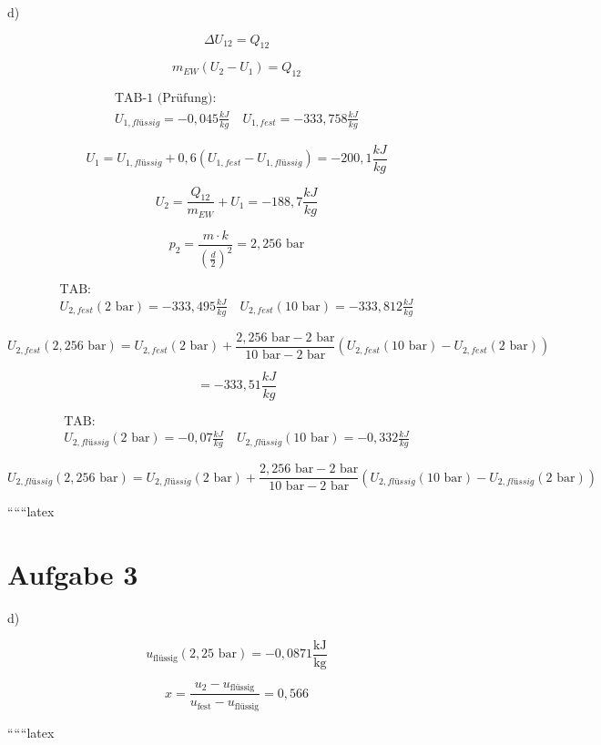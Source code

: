 d)

\[
\Delta U_{12} = Q_{12}
\]

\[
m_{EW} (U_2 - U_1) = Q_{12}
\]

\[
\begin{array}{c}
\text{TAB-1 (Prüfung):} \\
U_{1, flüssig} = -0,045 \frac{kJ}{kg} \quad U_{1, fest} = -333,758 \frac{kJ}{kg}
\end{array}
\]

\[
U_1 = U_{1, flüssig} + 0,6 \left( U_{1, fest} - U_{1, flüssig} \right) = -200,1 \frac{kJ}{kg}
\]

\[
U_2 = \frac{Q_{12}}{m_{EW}} + U_1 = -188,7 \frac{kJ}{kg}
\]

\[
p_2 = \frac{m \cdot k}{\left( \frac{d}{2} \right)^2} = 2,256 \text{ bar}
\]

\[
\begin{array}{c}
\text{TAB:} \\
U_{2, fest} (2 \text{ bar}) = -333,495 \frac{kJ}{kg} \quad U_{2, fest} (10 \text{ bar}) = -333,812 \frac{kJ}{kg}
\end{array}
\]

\[
U_{2, fest} (2,256 \text{ bar}) = U_{2, fest} (2 \text{ bar}) + \frac{2,256 \text{ bar} - 2 \text{ bar}}{10 \text{ bar} - 2 \text{ bar}} \left( U_{2, fest} (10 \text{ bar}) - U_{2, fest} (2 \text{ bar}) \right)
\]

\[
= -333,51 \frac{kJ}{kg}
\]

\[
\begin{array}{c}
\text{TAB:} \\
U_{2, flüssig} (2 \text{ bar}) = -0,07 \frac{kJ}{kg} \quad U_{2, flüssig} (10 \text{ bar}) = -0,332 \frac{kJ}{kg}
\end{array}
\]

\[
U_{2, flüssig} (2,256 \text{ bar}) = U_{2, flüssig} (2 \text{ bar}) + \frac{2,256 \text{ bar} - 2 \text{ bar}}{10 \text{ bar} - 2 \text{ bar}} \left( U_{2, flüssig} (10 \text{ bar}) - U_{2, flüssig} (2 \text{ bar}) \right)
\]

``````latex


\section*{Aufgabe 3}

d)

\[
u_{\text{flüssig}} (2,25 \text{ bar}) = -0{,}0871 \frac{\text{kJ}}{\text{kg}}
\]

\[
x = \frac{u_2 - u_{\text{flüssig}}}{u_{\text{fest}} - u_{\text{flüssig}}} = 0{,}566
\]

``````latex